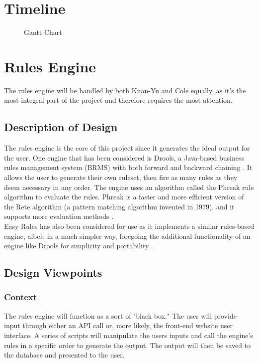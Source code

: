 \documentclass[draftclsnofoot,onecolumn,10pt,compsoc]{IEEEtran}
\begin{document}
\bigskip
\section{Timeline}
 \vspace{-5mm}
\begin{figure}[h]
    \caption{Gantt Chart}
    \label{fig:1}
\end{figure}


\pagebreak
\section{Rules Engine}
The rules engine will be handled by both Kuan-Yu and Cole equally, as it's the most integral part of the project and therefore requires the most attention.

\subsection{Description of Design}
The rules engine is the core of this project since it generates the ideal output for the user. One engine that has been considered is Drools, a Java-based business rules management system (BRMS) with both forward and backward chaining \cite{Drools}. It allows the user to generate their own ruleset, then fire as many rules as they deem necessary in any order. The engine uses an algorithm called the Phreak rule algorithm to evaluate the rules. Phreak is a faster and more efficient version of the Rete algorithm (a pattern matching algorithm invented in 1979), and it supports more evaluation methods \cite{Phreak}.\\[10pt]
Easy Rules has also been considered for use as it implements a similar rules-based engine, albeit in a much simpler way, foregoing the additional functionality of an engine like Drools for simplicity and portability \cite{Easy Rules}.

\subsection{Design Viewpoints}
\subsubsection{Context}
The rules engine will function as a sort of "black box." The user will provide input through either an API call or, more likely, the front-end website user interface. A series of scripts will manipulate the users inputs and call the engine's rules in a specific order to generate the output. The output will then be saved to the database and presented to the user.
\end{document}
